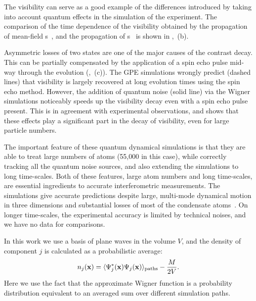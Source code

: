 The visibility can serve as a good example of the differences introduced by taking into account quantum effects in the simulation of the experiment.
The comparison of the time dependence of the visibility obtained by the propagation of mean-field s~, and the propagation of s~ is shown in ,~(b).

Asymmetric losses of two states are one of the major causes of the contrast decay.
This can be partially compensated by the application of a spin echo pulse mid-way through the evolution (,~(c)).
The GPE simulations wrongly predict (dashed lines) that visibility is largely recovered at long evolution times using the spin echo method.
However, the addition of quantum noise (solid line) via the Wigner simulations noticeably speeds up the visibility decay even with a spin echo pulse present.
This is in agreement with experimental observations, and shows that these effects play a significant part in the decay of visibility, even for large particle numbers.

The important feature of these quantum dynamical simulations is that they are able to treat large numbers of atoms (55,000 in this case), while correctly tracking all the quantum noise sources, and also extending the simulations to long time-scales.
Both of these features, large atom numbers and long time-scales, are essential ingredients to accurate interferometric measurements.
The simulations give accurate predictions despite large, multi-mode dynamical motion in three dimensions and substantial losses of most of the condensate atoms~\cite{Egorov2011}.
On longer time-scales, the experimental accuracy is limited by technical noises, and we have no data for comparisons.

In this work we use a basis of plane waves in the volume $V$, and the density of component $j$ is calculated as a probabilistic average:
\begin{equation}
\label{eqn:wigner-density}
    n_j (\mathbf{x})
        = \langle \Psi^*_j (\mathbf{x}) \Psi_j (\mathbf{x}) \rangle_{\mathrm{paths}} - \frac{M}{2V}.
\end{equation}
Here we use the fact that the approximate Wigner function is a probability distribution equivalent to an averaged sum over different simulation paths.

